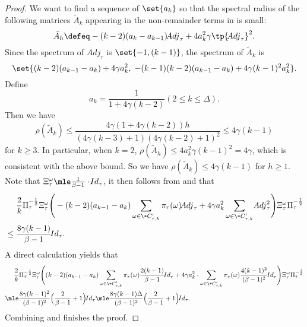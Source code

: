 \begin{proof}
We want to find a sequence of $\set{a_k}$
so that the spectral radius of the following matrices
$\tilde A_k$ appearing in the non-remainder terms in  is small:
\[
	\tilde A_h\defeq -(k-2)(a_{k}-a_{k-1})\!{Adj}_\tau + 4a_k^2\gamma\tp{\!{Adj}_\tau}^2.
\]
Since the spectrum of $\!{Adj}_\tau$ is $\set{-1, (k-1)}$, the spectrum of $\tilde A_k$ is
\[
	\set{
		(k-2)(a_{k-1}-a_k) + 4\gamma a_k^2, \;
		-(k-1)(k-2)(a_{k-1}-a_k) + 4\gamma (k-1)^2 a_k^2
	}.
\]
Define
\[
	a_k = \frac{1}{1+4\gamma(k-2)} (2\leq k \leq \Delta).
\]
Then we have
\begin{equation}\label{eqn:spectral-radius-of-A}
	\rho(\tilde A_k)\le \frac{4 \gamma  (1+4\gamma(k-2)) h}{(4 \gamma  (k-3)+1) (4 \gamma  (k-2)+1)^2}\le 4\gamma (k-1)
\end{equation}
for $k \geq 3$. In particular, when $k=2$, $\rho(\tilde A_h)\leq 4a_k^2 \gamma (k-1)^2 = 4\gamma$,
which is consistent with the above bound.
So we have $\rho(\tilde A_k)\leq 4\gamma (k-1)$ for $h\geq 1$.
Note that $\Xi_\tau^{\omega}\mle \frac{1}{\beta-1}\cdot \!{Id}_{\tau}$,
it then follows from  and  that 
\begin{align}\label{eqn:bound-adj}
	&\phantom{{}={}}
	\frac{2}{k}
    \Pi_\tau^{-\frac{1}{2}}
    \Xi_\tau^{\omega}
    \Bigg(
    -(k-2)
    (a_{k-1}-a_k)
    \sum_{\omega\in\+C'_{\tau,k}}
      \pi_\tau(\omega)
      \!{Adj}_\tau
    +
    4\gamma a_k^2
    \sum_{\omega\in \+C'_{\tau,k}}
      \!{Adj}^2_\tau
    \Bigg)
    \Xi_{\tau}^{\omega}
    \Pi_\tau^{-\frac{1}{2}}
    \notag
    \\&\le \frac{8\gamma (k-1)}{\beta-1} \!{Id}_\tau.
\end{align}
A direct calculation yields that
\begin{align}\label{eqn:bound-remainder}
    &\phantom{{}={}}
	\frac{2}{k}
    \Pi_\tau^{-\frac{1}{2}}
    \Xi_\tau^{\omega}
    \Bigg(
    (k-2)
    (a_{k-1}-a_k)
    \sum_{\omega\in\+C'_{\tau,k}}
      \pi_\tau(\omega)
      \frac{2(k-1)}{\beta-1}\!{Id}_\tau
    +
    4\gamma a_k^2 \cdot
    \sum_{\omega\in \+C'_{\tau,k}}
      \pi_\tau(\omega)
      \frac{4(k-1)^2}{(\beta-1)^2}\!{Id}_\tau
    \Bigg)
    \Xi_{\tau}^{\omega}
    \Pi_\tau^{-\frac{1}{2}}
    \notag
    \\&\mle
    \frac{8\gamma(k-1)^2}{(\beta-1)^2}\Big(\frac{2}{\beta-1} + 1\Big)\!{Id}_\tau
    \mle
    \frac{8\gamma(k-1)\Delta}{(\beta-1)^2}\Big(\frac{2}{\beta-1} + 1\Big)\!{Id}_\tau.
\end{align}
Combining  and  finishes the proof.

\end{proof}

